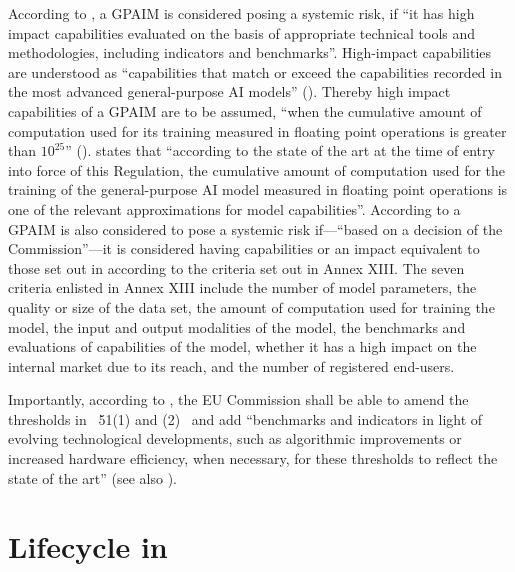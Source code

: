 According to , a GPAIM is considered posing a
systemic risk, if ``it has high impact capabilities evaluated on the basis of appropriate technical tools
and methodologies, including indicators and benchmarks''. 
%
High-impact capabilities are understood as ``capabilities that match or exceed the capabilities recorded
in the most advanced general-purpose AI models'' ().
%
%
Thereby high impact capabilities of a GPAIM are to be assumed, ``when the cumulative amount of computation used for its training
measured in floating point operations is greater than $10^{25}$'' ().
%
 states that ``according to the state of
the art at the time of entry into force of this Regulation, the cumulative amount of
computation used for the training of the general-purpose AI model measured in floating
point operations is one of the relevant approximations for model capabilities''.
%
According to  a GPAIM is also considered to pose a systemic risk if---``based on a decision of the Commission''---it is considered having capabilities or an impact
equivalent to those set out in  according to the criteria set out in Annex XIII.
%
The seven criteria enlisted in Annex XIII include the number of model parameters, the quality or size of the data set,  the amount of computation used for training the model, the input and output modalities of the model, the benchmarks and evaluations of capabilities of the model, whether it has a high impact on the internal market due to its reach, and the number of registered end-users.
% 

Importantly, according to , the EU Commission shall be able to amend the
thresholds in \Artx\ 51(1) and (2) \EUAIAct\ and add ``benchmarks
and indicators in light of evolving technological developments, such as algorithmic
improvements or increased hardware efficiency, when necessary, for these thresholds to
reflect the state of the art'' (see also ).


\section{Lifecycle in }\label{apx:lifecycle}

